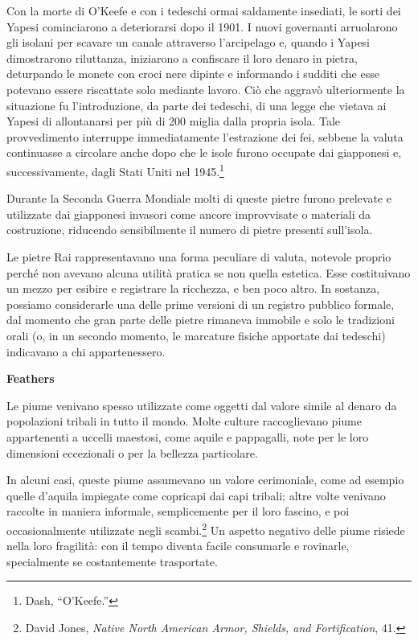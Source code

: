 \documentclass[
  a5paper,
  smalldemyvopaper,10pt,twoside,onecolumn,openright,extrafontsizes,hidelinks]{memoir}
\renewenvironment{quote}%
               {\list{}{\rightmargin=.6cm\leftmargin=.6cm}%
                \itshape \item[]}%
               {\endlist}
\begin{document}
\begin{quote}
Con la morte di O'Keefe e con i tedeschi ormai saldamente insediati, le
sorti dei Yapesi cominciarono a deteriorarsi dopo il 1901. I nuovi
governanti arruolarono gli isolani per scavare un canale attraverso
l'arcipelago e, quando i Yapesi dimostrarono riluttanza, iniziarono a
confiscare il loro denaro in pietra, deturpando le monete con croci nere
dipinte e informando i sudditi che esse potevano essere riscattate solo
mediante lavoro. Ciò che aggravò ulteriormente la situazione fu
l'introduzione, da parte dei tedeschi, di una legge che vietava ai
Yapesi di allontanarsi per più di 200 miglia dalla propria isola. Tale
provvedimento interruppe immediatamente l'estrazione dei fei, sebbene la
valuta continuasse a circolare anche dopo che le isole furono occupate
dai giapponesi e, successivamente, dagli Stati Uniti nel
1945.\footnote{Dash, ``O'Keefe.''}
\end{quote}

Durante la Seconda Guerra Mondiale molti di queste pietre furono
prelevate e utilizzate dai giapponesi invasori come ancore improvvisate
o materiali da costruzione, riducendo sensibilmente il numero di pietre
presenti sull'isola.

Le pietre Rai rappresentavano una forma peculiare di valuta, notevole
proprio perché non avevano alcuna utilità pratica se non quella
estetica. Esse costituivano un mezzo per esibire e registrare la
ricchezza, e ben poco altro. In sostanza, possiamo considerarle una
delle prime versioni di un registro pubblico formale, dal momento che
gran parte delle pietre rimaneva immobile e solo le tradizioni orali (o,
in un secondo momento, le marcature fisiche apportate dai tedeschi)
indicavano a chi appartenessero.

\textbf{Feathers}

Le piume venivano spesso utilizzate come oggetti dal valore simile al
denaro da popolazioni tribali in tutto il mondo. Molte culture
raccoglievano piume appartenenti a uccelli maestosi, come aquile e
pappagalli, note per le loro dimensioni eccezionali o per la bellezza
particolare.

In alcuni casi, queste piume assumevano un valore cerimoniale, come ad
esempio quelle d'aquila impiegate come copricapi dai capi tribali; altre
volte venivano raccolte in maniera informale, semplicemente per il loro
fascino, e poi occasionalmente utilizzate negli scambi.\footnote{David
  Jones, \emph{Native North American Armor, Shields, and Fortification},
  41.} Un aspetto negativo delle piume risiede nella loro fragilità: con
il tempo diventa facile consumarle e rovinarle, specialmente se
costantemente trasportate.
\end{document}
